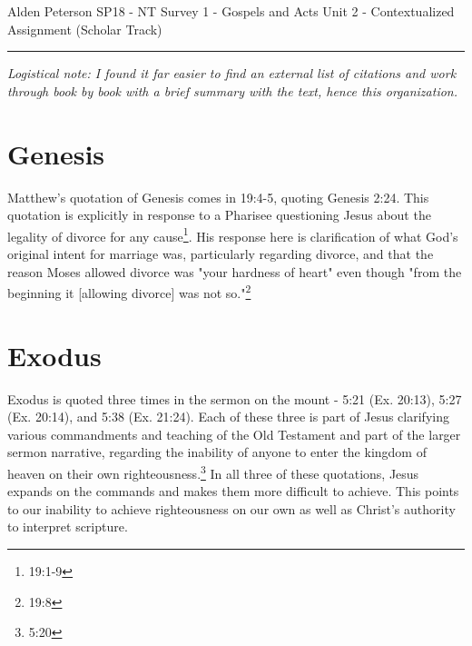 \documentclass[12pt]{turabian-researchpaper}
\begin{document}
\begin{singlespace}
\noindent Alden Peterson \newline
\noindent SP18 - NT Survey 1 - Gospels and Acts\newline
\noindent Unit 2 - Contextualized Assignment (Scholar Track)  \newline
\noindent\rule{4cm}{0.4pt}
\end{singlespace}


 
\textit{Logistical note: I found it far easier to find an external list of citations and work through  book by book with a brief summary with the text, hence this organization.}
\section{Genesis}

Matthew's quotation of Genesis comes in 19:4-5, quoting Genesis 2:24. This quotation is explicitly in response to a Pharisee questioning Jesus about the legality of divorce for any cause\footnote{19:1-9}. His response here is clarification of what God's original intent for marriage was, particularly regarding divorce, and that the reason Moses allowed divorce was "your hardness of heart" even though "from the beginning it [allowing divorce] was not so."\footnote{19:8}


\section{Exodus}

Exodus is quoted three times in the sermon on the mount - 5:21 (Ex. 20:13), 5:27 (Ex. 20:14), and 5:38 (Ex. 21:24). Each of these three is part of Jesus clarifying various commandments and teaching of the Old Testament and part of the larger sermon narrative, regarding the inability of anyone to enter the kingdom of heaven on their own righteousness.\footnote{5:20} In all three of these quotations, Jesus expands on the commands and makes them more difficult to achieve. This points to our inability to achieve righteousness on our own as well as Christ's authority to interpret scripture.
\end{document}

